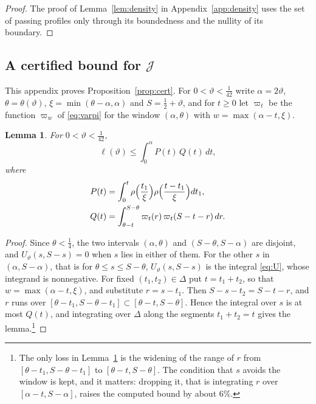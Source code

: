\documentclass[aps,prd,twocolumn,superscriptaddress,nofootinbib,longbibliography,floatfix,showkeys,nobalancelastpage,amsmath,amssymb,10pt]{revtex4-2}
\theoremstyle{plain}
\newtheorem{lemma}[theorem]{Lemma}
\theoremstyle{definition}
\theoremstyle{plain}
\newcommand{\Jc}{\mathcal{J}}
\begin{document}
\begin{proof}
The proof of Lemma~\ref{lem:density} in Appendix~\ref{app:density} uses the set of passing profiles only through its boundedness and the nullity of its boundary.
\end{proof}

\subsection{A certified bound for \texorpdfstring{$\Jc$}{J}}\label{app:cert}

This appendix proves Proposition~\ref{prop:cert}. For $0<\vartheta<\frac1{42}$ write $\alpha=2\vartheta$, $\theta=\theta(\vartheta)$, $\xi=\min(\theta-\alpha,\alpha)$ and $S=\frac12+\vartheta$, and for $t\ge0$ let $\varpi_t$ be the function $\varpi_w$ of \eqref{eq:varpi} for the window $(\alpha,\theta)$ with $w=\max(\alpha-t,\xi)$.

\begin{lemma}\label{lem:relax}
For $0<\vartheta<\frac1{42}$,
\[
\ell(\vartheta)\le\int_0^\alpha P(t)\,Q(t)\,dt,
\]
where
\begin{align*}
P(t)&=\int_0^t\rho\Bigl(\frac{t_1}\xi\Bigr)\rho\Bigl(\frac{t-t_1}\xi\Bigr)dt_1,\\
Q(t)&=\int_{\theta-t}^{S-\theta}\varpi_t(r)\,\varpi_t(S-t-r)\,dr.
\end{align*}
\end{lemma}

\begin{proof}
Since $\theta<\frac14$, the two intervals $(\alpha,\theta)$ and $(S-\theta,S-\alpha)$ are disjoint, and $U_\vartheta(s,S-s)=0$ when $s$ lies in either of them. For the other $s$ in $(\alpha,S-\alpha)$, that is for $\theta\le s\le S-\theta$, $U_\vartheta(s,S-s)$ is the integral \eqref{eq:U}, whose integrand is nonnegative. For fixed $(t_1,t_2)\in\Delta$ put $t=t_1+t_2$, so that $w=\max(\alpha-t,\xi)$, and substitute $r=s-t_1$. Then $S-s-t_2=S-t-r$, and $r$ runs over $[\theta-t_1,S-\theta-t_1]\subset[\theta-t,S-\theta]$. Hence the integral over $s$ is at most $Q(t)$, and integrating over $\Delta$ along the segments $t_1+t_2=t$ gives the lemma.\footnote{The only loss in Lemma~\ref{lem:relax} is the widening of the range of $r$ from $[\theta-t_1,S-\theta-t_1]$ to $[\theta-t,S-\theta]$. The condition that $s$ avoids the window is kept, and it matters: dropping it, that is integrating $r$ over $[\alpha-t,S-\alpha]$, raises the computed bound by about 6\%.}
\end{proof}
\end{document}
